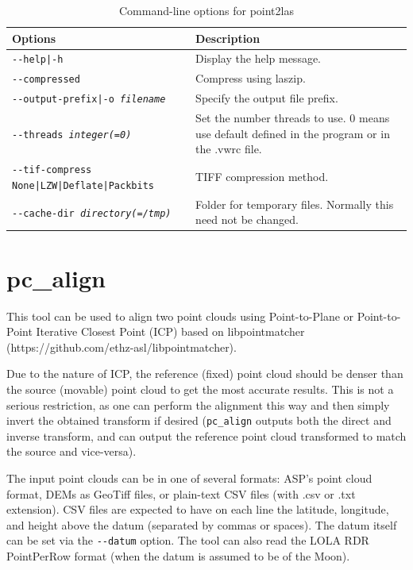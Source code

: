 \begin{longtable}{|l|p{10cm}|}
\caption{Command-line options for point2las}
\label{tbl:point2las}
\endfirsthead
\endhead
\endfoot
\endlastfoot
\hline
Options & Description \\ \hline \hline
\texttt{-\/-help|-h} & Display the help message.\\ \hline
\texttt{-\/-compressed} &
Compress using laszip. \\ \hline
\texttt{-\/-output-prefix|-o \textit{filename}} & Specify the output file prefix. \\ \hline
\texttt{-\/-threads \textit{integer(=0)}} & Set the number threads to use. 0 means use default defined in the program or in the .vwrc file.\\ \hline
\texttt{-\/-tif-compress None|LZW|Deflate|Packbits} & TIFF compression method.\\ \hline
\texttt{-\/-cache-dir \textit{directory(=/tmp)}} & Folder for temporary files. Normally this need not be changed.\\ \hline
\end{longtable}

\section{pc\_align}
\label{pcalign}

This tool can be used to align two point clouds using Point-to-Plane or
Point-to-Point Iterative Closest Point (ICP) based on libpointmatcher
(https://github.com/ethz-asl/libpointmatcher).

Due to the nature of ICP, the reference (fixed) point cloud should be
denser than the source (movable) point cloud to get the most accurate
results. This is not a serious restriction, as one can perform the
alignment this way and then simply invert the obtained transform if
desired (\texttt{pc\_align} outputs both the direct and inverse
transform, and can output the reference point cloud transformed to match
the source and vice-versa).

The input point clouds can be in one of several formats: ASP's point
cloud format, DEMs as GeoTiff files, or plain-text CSV files (with .csv
or .txt extension). CSV files are expected to have on each line the
latitude, longitude, and height above the datum (separated by commas or
spaces). The datum itself can be set via the \texttt{-\/-datum} option.
The tool can also read the LOLA RDR PointPerRow format (when the datum
is assumed to be of the Moon).

